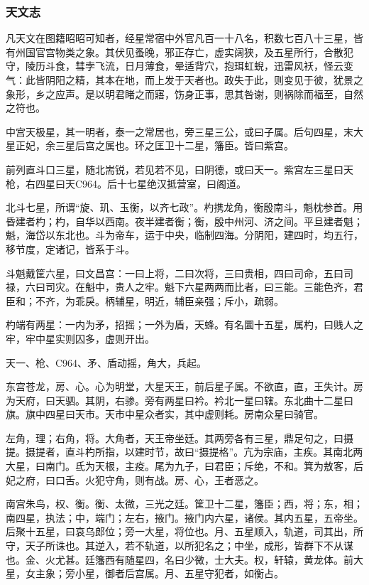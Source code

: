 \documentclass[]{article}
\begin{document}
\hypertarget{header-n1829}{%
\subsubsection{天文志}\label{header-n1829}}

凡天文在图籍昭昭可知者，经星常宿中外官凡百一十八名，积数七百八十三星，皆有州国官宫物类之象。其伏见蚤晚，邪正存亡，虚实阔狭，及五星所行，合散犯守，陵历斗食，彗孛飞流，日月薄食，晕适背穴，抱珥虹蜺，迅雷风袄，怪云变气：此皆阴阳之精，其本在地，而上发于天者也。政失于此，则变见于彼，犹景之象形，乡之应声。是以明君睹之而寤，饬身正事，思其咎谢，则祸除而福至，自然之符也。

中宫天极星，其一明者，泰一之常居也，旁三星三公，或曰子属。后句四星，末大星正妃，余三星后宫之属也。环之匡卫十二星，籓臣。皆曰紫宫。

前列直斗口三星，随北耑锐，若见若不见，曰阴德，或曰天一。紫宫左三星曰天枪，右四星曰天C964。后十七星绝汉抵营室，曰阁道。

北斗七星，所谓``旋、玑、玉衡，以齐七政''。杓携龙角，衡殷南斗，魁枕参首。用昏建者杓；杓，自华以西南。夜半建者衡；衡，殷中州河、济之间。平旦建者魁；魁，海岱以东北也。斗为帝车，运于中央，临制四海。分阴阳，建四时，均五行，移节度，定诸记，皆系于斗。

斗魁戴筐六星，曰文昌宫：一曰上将，二曰次将，三曰贵相，四曰司命，五曰司禄，六曰司灾。在魁中，贵人之牢。魁下六星两两而比者，曰三能。三能色齐，君臣和；不齐，为乖戾。柄辅星，明近，辅臣亲强；斥小，疏弱。

杓端有两星：一内为矛，招摇；一外为盾，天蜂。有名圜十五星，属杓，曰贱人之牢，牢中星实则囚多，虚则开出。

天一、枪、C964、矛、盾动摇，角大，兵起。

东宫苍龙，房、心。心为明堂，大星天王，前后星子属。不欲直，直，王失计。房为天府，曰天驷。其阴，右骖。旁有两星曰衿。衿北一星曰辖。东北曲十二星曰旗。旗中四星曰天市。天市中星众者实，其中虚则耗。房南众星曰骑官。

左角，理；右角，将。大角者，天王帝坐廷。其两旁各有三星，鼎足句之，曰摄提。摄提者，直斗杓所指，以建时节，故曰``摄提格''。亢为宗庙，主疾。其南北两大星，曰南门。氐为天根，主疫。尾为九子，曰君臣；斥绝，不和。箕为敖客，后妃之府，曰口舌。火犯守角，则有战。房、心，王者恶之。

南宫朱鸟，权、衡。衡、太微，三光之廷。筐卫十二星，籓臣；西，将；东，相；南四星，执法；中，端门；左右，掖门。掖门内六星，诸侯。其内五星，五帝坐。后聚十五星，曰哀乌郎位；旁一大星，将位也。月、五星顺入，轨道，司其出，所守，天子所诛也。其逆入，若不轨道，以所犯名之；中坐，成形，皆群下不从谋也。金、火尤甚。廷籓西有随星四，名曰少微，士大夫。权，轩辕，黄龙体。前大星，女主象；旁小星，御者后宫属。月、五星守犯者，如衡占。
\end{document}
